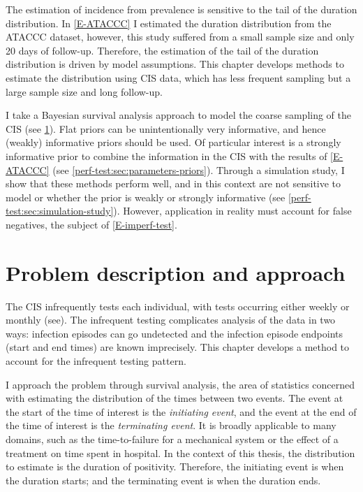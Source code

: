 \documentclass[thesis.tex]{subfiles}
\begin{document}
The estimation of incidence from prevalence is sensitive to the tail of the duration distribution.
In \cref{E-ATACCC} I estimated the duration distribution from the ATACCC dataset, however, this study suffered from a small sample size and only 20 days of follow-up.
Therefore, the estimation of the tail of the duration distribution is driven by model assumptions.
This chapter develops methods to estimate the distribution using CIS data, which has less frequent sampling but a large sample size and long follow-up.

I take a Bayesian survival analysis approach to model the coarse sampling of the CIS (see \cref{perf-test:sec:problem}).
Flat priors can be unintentionally very informative, and hence (weakly) informative priors should be used.
Of particular interest is a strongly informative prior to combine the information in the CIS with the results of \cref{E-ATACCC} (see \cref{perf-test:sec:parameters-priors}).
Through a simulation study, I show that these methods perform well, and in this context are not sensitive to model or whether the prior is weakly or strongly informative (see \cref{perf-test:sec:simulation-study}).
However, application in reality must account for false negatives, the subject of \cref{E-imperf-test}.

\section{Problem description and approach} \label{perf-test:sec:problem}

The CIS infrequently tests each individual, with tests occurring either weekly or monthly (see).
The infrequent testing complicates analysis of the data in two ways: infection episodes can go undetected and the infection episode endpoints (start and end times) are known imprecisely.
This chapter develops a method to account for the infrequent testing pattern.

I approach the problem through survival analysis, the area of statistics concerned with estimating the distribution of the times between two events.
The event at the start of the time of interest is the \emph{initiating event}, and the event at the end of the time of interest is the \emph{terminating event}.
It is broadly applicable to many domains, such as the time-to-failure for a mechanical system or the effect of a treatment on time spent in hospital.
In the context of this thesis, the distribution to estimate is the duration of positivity.
Therefore, the initiating event is when the duration starts; and the terminating event is when the duration ends.
\end{document}
